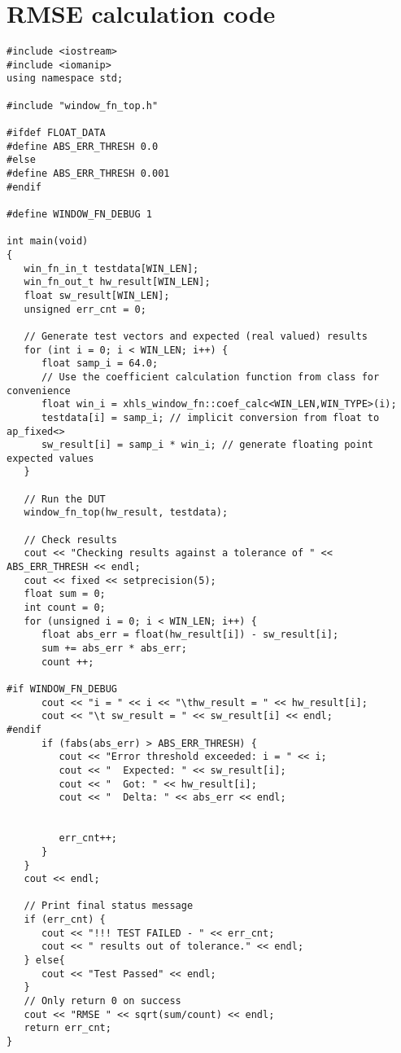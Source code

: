 \section{RMSE calculation code}
\lstset{language=C++}
\begin{lstlisting}
#include <iostream>
#include <iomanip>
using namespace std;

#include "window_fn_top.h"

#ifdef FLOAT_DATA
#define ABS_ERR_THRESH 0.0
#else
#define ABS_ERR_THRESH 0.001
#endif

#define WINDOW_FN_DEBUG 1

int main(void)
{
   win_fn_in_t testdata[WIN_LEN];
   win_fn_out_t hw_result[WIN_LEN];
   float sw_result[WIN_LEN];
   unsigned err_cnt = 0;

   // Generate test vectors and expected (real valued) results
   for (int i = 0; i < WIN_LEN; i++) {
      float samp_i = 64.0;
      // Use the coefficient calculation function from class for convenience
      float win_i = xhls_window_fn::coef_calc<WIN_LEN,WIN_TYPE>(i);
      testdata[i] = samp_i; // implicit conversion from float to ap_fixed<>
      sw_result[i] = samp_i * win_i; // generate floating point expected values
   }

   // Run the DUT
   window_fn_top(hw_result, testdata);

   // Check results
   cout << "Checking results against a tolerance of " << ABS_ERR_THRESH << endl;
   cout << fixed << setprecision(5);
   float sum = 0;
   int count = 0;
   for (unsigned i = 0; i < WIN_LEN; i++) {
      float abs_err = float(hw_result[i]) - sw_result[i];
      sum += abs_err * abs_err;
      count ++;

#if WINDOW_FN_DEBUG
      cout << "i = " << i << "\thw_result = " << hw_result[i];
      cout << "\t sw_result = " << sw_result[i] << endl;
#endif
      if (fabs(abs_err) > ABS_ERR_THRESH) {
         cout << "Error threshold exceeded: i = " << i;
         cout << "  Expected: " << sw_result[i];
         cout << "  Got: " << hw_result[i];
         cout << "  Delta: " << abs_err << endl;


         err_cnt++;
      }
   }
   cout << endl;

   // Print final status message
   if (err_cnt) {
      cout << "!!! TEST FAILED - " << err_cnt;
      cout << " results out of tolerance." << endl;
   } else{
      cout << "Test Passed" << endl;
   }
   // Only return 0 on success
   cout << "RMSE " << sqrt(sum/count) << endl;
   return err_cnt;
}


\end{lstlisting}

